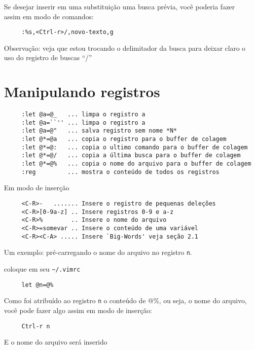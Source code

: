 Se desejar inserir em uma substituição uma busca prévia, você poderia
fazer assim em modo de comandos:

\begin{verbatim}
     :%s,<Ctrl-r>/,novo-texto,g
\end{verbatim}

Observação: veja que estou trocando o delimitador da busca para deixar
claro o uso do registro de buscas ``/''

\section{Manipulando registros}
\label{Manipulando registros}

\begin{verbatim}
     :let @a=@_   ... limpa o registro a
     :let @a=``'' ... limpa o registro a
     :let @a=@"   ... salva registro sem nome *N*
     :let @*=@a   ... copia o registro para o buffer de colagem
     :let @*=@:   ... copia o ultimo comando para o buffer de colagem
     :let @*=@/   ... copia a última busca para o buffer de colagem
     :let @*=@%   ... copia o nome do arquivo para o buffer de colagem
     :reg         ... mostra o conteúdo de todos os registros
\end{verbatim}

Em modo de inserção

\begin{verbatim}
     <C-R>-   ....... Insere o registro de pequenas deleções
     <C-R>[0-9a-z] .. Insere registros 0-9 e a-z
     <C-R>%        .. Insere o nome do arquivo
     <C-R>=somevar .. Insere o conteúdo de uma variável
     <C-R><C-A> ..... Insere `Big-Words' veja seção 2.1 
\end{verbatim}


Um exemplo: pré-carregando o nome do arquivo no registro \verb+n+.

coloque em seu \verb+~/.vimrc+

\begin{verbatim}
     let @n=@%
\end{verbatim}

Como foi atribuído ao registro \verb+n+ o conteúdo de @\%, ou seja, o nome
do arquivo, você pode fazer algo assim em modo de inserção:

\begin{verbatim}
     Ctrl-r n
\end{verbatim}

E o nome do arquivo será inserido


